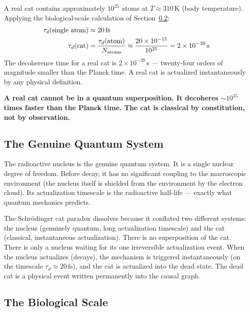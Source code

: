\documentclass[12pt,a4paper]{article}
\begin{document}
A real cat contains approximately $10^{25}$ atoms at $T\approx310\,\mathrm{K}$ (body temperature).  Applying the biological-scale calculation of Section~\ref{sec:bio}:
\begin{align}
  \tau_d(\text{single atom}) &\approx 20\,\mathrm{fs} \\
  \tau_d(\text{cat}) &= \frac{\tau_d(\text{atom})}{N_{\rm atoms}} \approx \frac{20\times10^{-15}}{10^{25}} = 2\times10^{-39}\,\mathrm{s}
\end{align}
The decoherence time for a real cat is $2\times10^{-39}\,\mathrm{s}$ --- twenty-four orders of magnitude smaller than the Planck time.  A real cat is actualized instantaneously by any physical definition.

\textbf{A real cat cannot be in a quantum superposition.  It decoheres $\sim10^{35}$ times faster than the Planck time.  The cat is classical by constitution, not by observation.}

\subsection{The Genuine Quantum System}

The radioactive nucleus is the genuine quantum system.  It is a single nuclear degree of freedom.  Before decay, it has no significant coupling to the macroscopic environment (the nucleus itself is shielded from the environment by the electron cloud).  Its actualization timescale is the radioactive half-life --- exactly what quantum mechanics predicts.

The Schr\"odinger cat paradox dissolves because it conflated two different systems: the nucleus (genuinely quantum, long actualization timescale) and the cat (classical, instantaneous actualization).  There is no superposition of the cat.  There is only a nucleus waiting for its one irreversible actualization event.  When the nucleus actualizes (decays), the mechanism is triggered instantaneously (on the timescale $\tau_d\approx20\,\mathrm{fs}$), and the cat is actualized into the dead state.  The dead cat is a physical event written permanently into the causal graph.

\subsection{The Biological Scale}\label{sec:bio}
\end{document}
